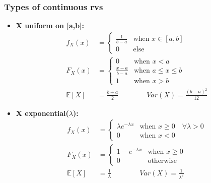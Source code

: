 \documentclass[10pt]{article}
\begin{document}
\subsubsection*{Types of continuous rvs}

\begin{multicols}{2}
\begin{itemize}
\item \textbf{X uniform on [a,b]:}
  \begin{equation*}
    \boxed{
      \begin{aligned}
        f_X(x) &=
        \begin{cases}
          \frac{1}{b-a} & \text{when } x \in [a,b] \\
          0 & \text{else}
        \end{cases} \\
        F_X(x) &=
        \begin{cases}
          0 & \text{when } x < a \\
          \frac{x-a}{b-a} & \text{when } a\leq x\leq b \\
          1 & \text{when } x > b
        \end{cases} \\
        \mathbb{E}[X] &= \frac{b+a}{2} \qquad \qquad
        Var(X) = \frac{(b-a)^2}{12}
      \end{aligned}
    }
  \end{equation*}

\item \textbf{X exponential($\lambda$):}
  \begin{equation*}
    \boxed{
      \begin{aligned}
        f_X(x) &=
        \begin{cases}
          \lambda e^{-\lambda x} & \text{when } x \geq 0 \quad \forall
          \lambda > 0 \\
          0 & \text{when } x < 0
        \end{cases} \\
        F_X(x) &=
        \begin{cases}
          1 - e^{-\lambda x} & \text{when } x\geq 0 \\
          0 & \text{otherwise}
        \end{cases} \\
        \mathbb{E}[X] &= \frac{1}{\lambda} \qquad \qquad
        Var(X) = \frac{1}{\lambda^2}
      \end{aligned}
    }
  \end{equation*}


\end{itemize}
\end{multicols}
\end{document}
